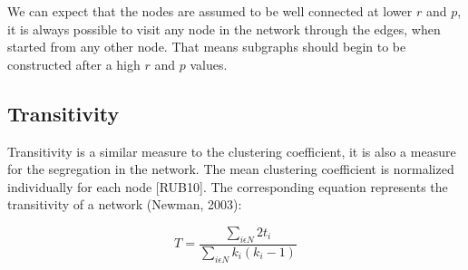 \documentclass[12pt]{article}
\begin{document}
We can expect that the nodes are assumed to be well connected at lower $r$ and $p$, it is always possible to visit any node in the network through the edges, when started from any other node. That means subgraphs should begin to be constructed after a high $r$ and $p$ values.  
%
%
%
\subsection{Transitivity}
	Transitivity is a similar measure to the clustering coefficient, it is also a measure for the segregation in the network. The mean clustering coefficient is normalized individually for each node [RUB10]. The corresponding equation represents the transitivity of a network (Newman, 2003):
	
\begin{equation}
 T = \frac{\sum\limits_{i \epsilon N} 2 t_i}{\sum\limits_{i \epsilon N}k_i (k_i - 1)}
\end{equation}	
\end{document}

